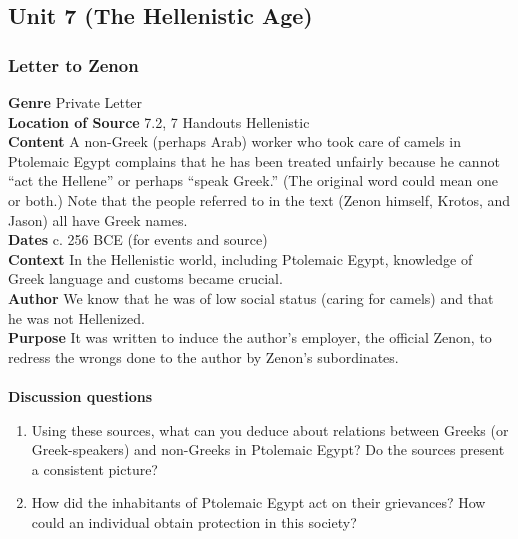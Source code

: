 \documentclass{article}
\begin{document}
\subsection*{Unit 7 (The Hellenistic Age)}
\subsubsection*{Letter to Zenon}
\textbf{Genre}
Private Letter \\
\textbf{Location of Source}
7.2, 7 Handouts Hellenistic \\
\textbf{Content}
A non-Greek (perhaps Arab) worker who took care of camels in Ptolemaic Egypt complains that he has been treated unfairly because he cannot “act the Hellene” or perhaps “speak Greek.”  (The original word could mean one or both.)  Note that the people referred to in the text (Zenon himself, Krotos, and Jason) all have Greek names. \\
\textbf{Dates}
c. 256 BCE (for events and source) \\
\textbf{Context}
In the Hellenistic world, including Ptolemaic Egypt, knowledge of Greek language and customs became crucial. \\
\textbf{Author}
We know that he was of low social status (caring for camels) and that he was not Hellenized. \\
\textbf{Purpose}
It was written to induce the author’s employer, the official Zenon, to redress the wrongs done to the author by Zenon’s subordinates. \\
\\
\textbf{Discussion questions}
\begin{enumerate}
  \item Using these sources, what can you deduce about relations between Greeks (or Greek-speakers) and non-Greeks in Ptolemaic Egypt? Do the sources present a consistent picture?
  \item How did the inhabitants of Ptolemaic Egypt act on their grievances? How could an individual obtain protection in this society?
\end{enumerate}
\end{document}

